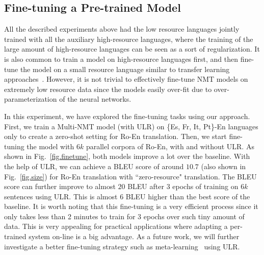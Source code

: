 \subsection{Fine-tuning a Pre-trained Model}
All  the described experiments above had  the low resource languages  jointly trained  with all the auxiliary high-resource languages, where the training of the large amount of high-resource languages can be seen as a sort of regularization.  It is also common to  train a model on high-resource languages first, and then fine-tune the model on a small resource language similar to transfer learning approaches~\citep{zoph2016transfer}. However, it is not trivial to effectively fine-tune NMT models on extremely low resource data since  the models  easily over-fit due to over-parameterization of the neural networks. 

In this experiment, we have explored the  fine-tuning tasks using our approach. First, we train a Multi-NMT model (with ULR)  on \{Es, Fr, It, Pt\}-En  languages only to create a zero-shot setting for Ro-En translation. Then, we start fine-tuning the model with $6k$ parallel corpora of Ro-En, with and without ULR. As shown in Fig.~\ref{fig.finetune}, both  models improve a lot over the baseline. 
With the help of ULR, we can  achieve a BLEU score of around $10.7$ (also shown in Fig.~\ref{fig.size}) for Ro-En translation with ``zero-resource" translation. The BLEU score can  further  improve to almost  $20$ BLEU after 3 epochs of training on $6k$ sentences using ULR. This is almost $6$ BLEU higher than the best score of the baseline. It is worth noting that this fine-tuning is a very efficient  process since it only takes less than 2 minutes to train for 3 epochs over such  tiny amount of data. This is very appealing  for practical applications where  adapting a per-trained system  on-line is a big advantage.  As a future work, we will further investigate a better fine-tuning strategy such as meta-learning~\citep{finn2017model} using ULR.


